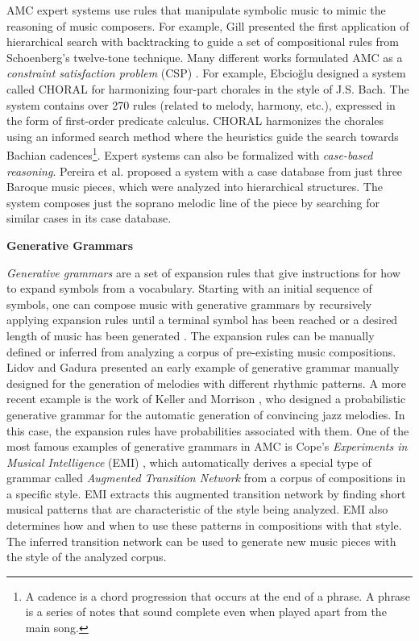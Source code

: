 \noindent
AMC expert systems use rules that manipulate symbolic music to mimic the reasoning of music composers. For example, Gill \cite{gill1963technique} presented the first application of hierarchical search with backtracking to guide a set of compositional rules from Schoenberg’s twelve-tone technique. Many different works formulated AMC as a \textit{constraint satisfaction problem} (CSP) \cite{anders2011constraint}. For example, Ebcio{\u{g}}lu \cite{ebciouglu1988expert} designed a system called CHORAL for harmonizing four-part chorales in the style of J.S. Bach. The system contains over 270 rules (related to melody, harmony, etc.), expressed in the form of first-order predicate calculus. CHORAL harmonizes the chorales using an informed search method where the heuristics guide the search towards Bachian cadences\footnote{A cadence is a chord progression that occurs at the end of a phrase. A phrase is a series of notes that sound complete even when played apart from the main song.}. Expert systems can also be formalized with \textit{case-based reasoning}. Pereira et al. \cite{pereira1997composing} proposed a system with a case database from just three Baroque music pieces, which were analyzed into hierarchical structures. The system composes just the soprano melodic line of the piece by searching for similar cases in its case database.

\vspace{0.1in}
\noindent
\textbf{Generative Grammars}

\noindent
\textit{Generative grammars} are a set of expansion rules that give instructions for how to expand symbols from a vocabulary. Starting with an initial sequence of symbols, one can compose music with generative grammars by recursively applying expansion rules until a terminal symbol has been reached or a desired length of music has been generated \cite{holtzman1981using}. The expansion rules can be manually defined or inferred from analyzing a corpus of pre-existing music compositions. Lidov and Gadura \cite{lidov1973melody} presented an early example of generative grammar manually designed for the generation of melodies with different rhythmic patterns. A more recent example is the work of Keller and Morrison \cite{keller2007grammatical}, who designed a probabilistic generative grammar for the automatic generation of convincing jazz melodies. In this case, the expansion rules have probabilities associated with them. One of the most famous examples of generative grammars in AMC is Cope's \textit{Experiments in Musical Intelligence} (EMI) \cite{cope1989experiments}, which automatically derives a special type of grammar called \textit{Augmented Transition Network} from a corpus of compositions in a specific style. EMI extracts this augmented transition network by finding short musical patterns that are characteristic of the style being analyzed. EMI also determines how and when to use these patterns in compositions with that style. The inferred transition network can be used to generate new music pieces with the style of the analyzed corpus.

